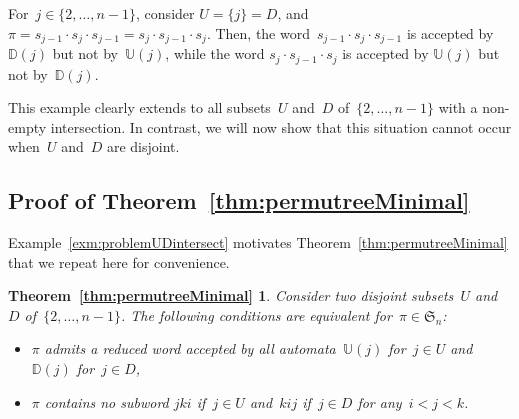 \documentclass[ALCO]{cedram}
\newcommand{\fS}{\mathfrak{S}}
\newcommand{\automatonU}{\mathbb{U}}
\newcommand{\automatonD}{\mathbb{D}}
\begin{document}
\begin{example}\label{exm:problemUDintersect}
For~$j \in \{2, \dots, n-1\}$, consider $U = \{j\} = D$, and~$\pi = s_{j-1} \cdot s_j \cdot s_{j-1} = s_j \cdot s_{j-1} \cdot s_j$.
Then, the word~$s_{j-1} \cdot s_j \cdot s_{j-1}$ is accepted by $\automatonD(j)$ but not by~$\automatonU(j)$, while the word $s_j \cdot s_{j-1} \cdot s_j$ is accepted by $\automatonU(j)$ but not by~$\automatonD(j)$.
\end{example}

This example clearly extends to all subsets~$U$ and~$D$ of~$\{2, \dots, n-1\}$ with a non-empty intersection.
In contrast, we will now show that this situation cannot occur when~$U$ and~$D$ are disjoint.

\subsection{Proof of Theorem~\ref{thm:permutreeMinimal}}

Example~\ref{exm:problemUDintersect} motivates Theorem~\ref{thm:permutreeMinimal} that we repeat here for convenience.

\newtheorem*{thm:permutreeMinimal}{Theorem~\ref{thm:permutreeMinimal}}
\begin{thm:permutreeMinimal}
Consider two disjoint subsets~$U$ and~$D$ of~$\{2, \dots, n-1\}$.
The following conditions are equivalent for~$\pi \in \fS_n$:
\begin{itemize}
\item $\pi$ admits a reduced word accepted by all automata~$\automatonU(j)$ for~$j \in U$ and~$\automatonD(j)$ for~${j \in D}$,
\item $\pi$ contains no subword $jki$ if~$j \in U$ and~$kij$ if~$j \in D$ for any~$i < j < k$.
\end{itemize}
\end{thm:permutreeMinimal}
\end{document}

